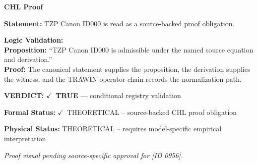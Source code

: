 \vspace{0.45em}
\noindent\textbf{CHL Proof}\par
\textbf{Statement:} TZP Canon ID000 is read as a source-backed proof obligation.

\textbf{Logic Validation:}\\
\textbf{Proposition:} ``TZP Canon ID000 is admissible under the named source equation and derivation.''\\
\textbf{Proof:} The canonical statement supplies the proposition, the derivation supplies the witness, and the TRAWIN operator chain records the normalization path.

\textbf{VERDICT:} \ensuremath{\checkmark}\ \textbf{TRUE} --- conditional registry validation

\textbf{Formal Status:} \ensuremath{\checkmark}\ THEORETICAL -- source-backed CHL proof obligation

\textbf{Physical Status:} THEORETICAL -- requires model-specific empirical interpretation
\par\vspace{0.45em}
\par
\vfill
\begingroup\footnotesize\itshape
Proof visual pending source-specific approval for [ID 0956].
\par\endgroup
\vfill
\endgroup
\endgroup
